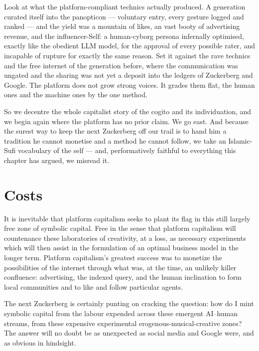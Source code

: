 Look at what the platform-compliant technics actually produced. A generation curated itself into the panopticon --- voluntary entry, every gesture logged and ranked --- and the yield was a mountain of likes, an vast booty of advertising revenue, and the influencer-Self: a human-cyborg persona infernally optimised, exactly like the obedient LLM model, for the approval of every possible rater, and incapable of rupture for exactly the same reason. Set it against the rave technics and the free internet of the generation before, where the communication was ungated and the sharing was not yet a deposit into the ledgers of Zuckerberg and Google. The platform does not grow strong voices. It grades them flat, the human ones and the machine ones by the one method.

So we decentre the whole capitalist story of the cogito and its individuation, and we begin again where the platform has no prior claim. We go east. And because the surest way to keep the next Zuckerberg off our trail is to hand him a tradition he cannot monetise and a method he cannot follow, we take an Islamic-Sufi vocabulary of the self --- and, performatively faithful to everything this chapter has argued, we misread it.

\section{Costs}
It is inevitable that platform capitalism seeks to plant its flag in this still largely free zone of symbolic capital. Free in the sense that platform capitalism  will countenance these laboratories of creativity, at a loss, as necessary experiments which will then assist in the formulation of an optimal business model in the longer term. 
Platform capitalism's greatest success was to monetize the possibilities of the internet through what was, at the time, an unlikely killer confluence: advertising, the indexed query, and the human inclination to form local communities and to like and follow particular agents. 

The next Zuckerberg is certainly punting on cracking the question: how do I mint symbolic capital from the labour expended across these emergent AI--human streams, from these expensive experimental erogenous-musical-creative zones? The answer will no doubt be as unexpected as social media and Google were, and as obvious in hindsight.


